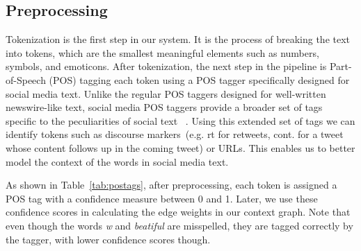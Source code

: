 \documentclass[preprint,review,12pt]{elsarticle}
\begin{document}
\subsection{Preprocessing}


Tokenization is the first step in our system. It is the process of breaking the text into tokens, which are the smallest meaningful elements such as numbers, symbols, and emoticons. After tokenization, the next step in the pipeline is Part-of-Speech (POS) tagging each token using a POS tagger specifically designed for social media text. Unlike the regular POS taggers designed for well-written newswire-like text, social media POS taggers provide a broader set of tags specific to the peculiarities of social text ~\cite{DBLP:conf/naacl/OwoputiODGSS13,Gimpel:2011:PTT:2002736.2002747}. Using this extended set of tags we can identify tokens such as discourse markers~(e.g. rt for retweets, cont. for a tweet whose content follows up in the coming tweet) or URLs. This enables us to better model the context of the words in social media text.

As shown in Table~\ref{tab:postags}, after preprocessing, each token is assigned a POS tag with a confidence measure between 0 and 1. Later, we use these confidence scores in calculating the edge weights in our context graph. Note that even though the words \emph{w} and\emph{ beatiful} are misspelled, they are tagged correctly by the tagger, with lower confidence scores though.
\end{document}
